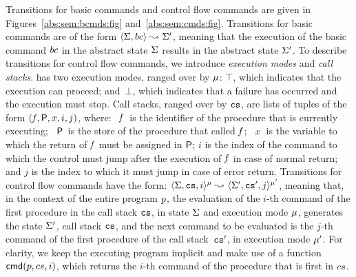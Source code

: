 Transitions for basic commands and control flow commands are given 
in Figures~\ref{abs:sem:bcmds:fig} and~\ref{abs:sem:cmds:fig}. Transitions for 
basic commands are of the form 
$\langle \Sigma, bc \rangle \leadsto_{} \Sigma'$, meaning that the execution of the basic command 
$bc$ in the abstract state $\Sigma$ results in the abstract state $\Sigma'$. 
%
To describe transitions for control flow commands, we introduce \emph{execution modes} and 
\emph{call stacks}.  \jsil has two execution modes, ranged over by $\mu$: 
$\top$, which indicates that the execution can proceed; and~$\bot$, which indicates that a failure 
has occurred and the execution must stop. Call stacks, ranged over by $\mathtt{cs}$, are lists of tuples of the form $(\mathit{f}, {\sf P}, x, i, j)$, where: 
~$\mathit{f}$~is the identifier of the procedure that is currently executing;
~${\sf P}$~is the store of the procedure that called $\mathit{f}$; 
~$x$~is the variable to which the return of $\mathit{f}$ must be assigned in ${\sf P}$; 
 $i$ is the index of the command to which the control must jump after the execution of $\mathit{f}$ in case of normal return; 
and  $j$ is the index to which it must jump in case of error return. 
Transitions for control flow commands have the form:  $\langle \Sigma, \mathtt{cs}, i \rangle^{\mu} \leadsto_{} \langle \Sigma', \mathtt{cs}', j \rangle^{\mu'}$, 
meaning that, in the context of the entire program $p$, the evaluation of the $i$-th command of the first procedure in the 
call stack $\mathtt{cs}$, in state $\Sigma$ and execution mode $\mu$, generates 
the state $\Sigma'$, call stack $\mathtt{cs}$,  and the next command to be evaluated is the $j$-th command of the first procedure 
of the call stack~$\mathtt{cs}'$, in execution mode $\mu'$. 
For clarity, we keep the executing program implicit and make use of a function $\ccmd{\prog, \cs, i}$, which 
returns the $i$-th command of the procedure that is first in $cs$. %



